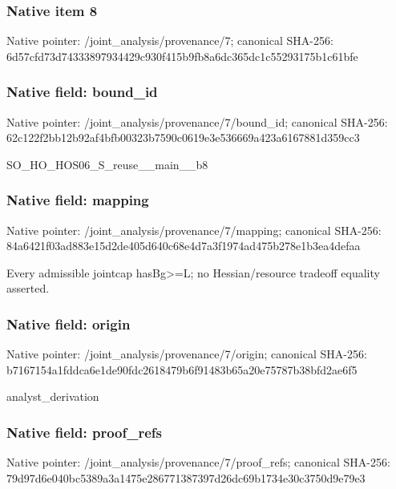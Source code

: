 \documentclass[10pt,a4paper]{article}
\begin{document}
\subsubsection{Native item 8}
Native pointer: /joint\_\allowbreak{}analysis/provenance/7; canonical SHA-256: 6d57cfd73d74333897934429c930f415b9fb8a6dc365dc1c55293175b1c61bfe

\subsubsection{Native field: bound\_\allowbreak{}id}
Native pointer: /joint\_\allowbreak{}analysis/provenance/7/bound\_\allowbreak{}id; canonical SHA-256: 62c122f2bb12b92af4bfb00323b7590c0619e3e536669a423a6167881d359cc3

\begingroup\raggedright\sloppy SO\_\allowbreak{}HO\_\allowbreak{}HOS06\_\allowbreak{}S\_\allowbreak{}reuse\_\allowbreak{}\_\allowbreak{}main\_\allowbreak{}\_\allowbreak{}b8\par\endgroup

\subsubsection{Native field: mapping}
Native pointer: /joint\_\allowbreak{}analysis/provenance/7/mapping; canonical SHA-256: 84a6421f03ad883e15d2de405d640c68e4d7a3f1974ad475b278e1b3ea4defaa

\begingroup\raggedright\sloppy Every admissible jointcap hasBg>=\allowbreak{}L;\allowbreak{} no Hessian/\allowbreak{}resource tradeoff equality asserted.\par\endgroup

\subsubsection{Native field: origin}
Native pointer: /joint\_\allowbreak{}analysis/provenance/7/origin; canonical SHA-256: b7167154a1fddca6e1de90fdc2618479b6f91483b65a20e75787b38bfd2ae6f5

\begingroup\raggedright\sloppy analyst\_\allowbreak{}derivation\par\endgroup

\subsubsection{Native field: proof\_\allowbreak{}refs}
Native pointer: /joint\_\allowbreak{}analysis/provenance/7/proof\_\allowbreak{}refs; canonical SHA-256: 79d97d6e040bc5389a3a1475e286771387397d26dc69b1734e30c3750d9e79e3
\end{document}

